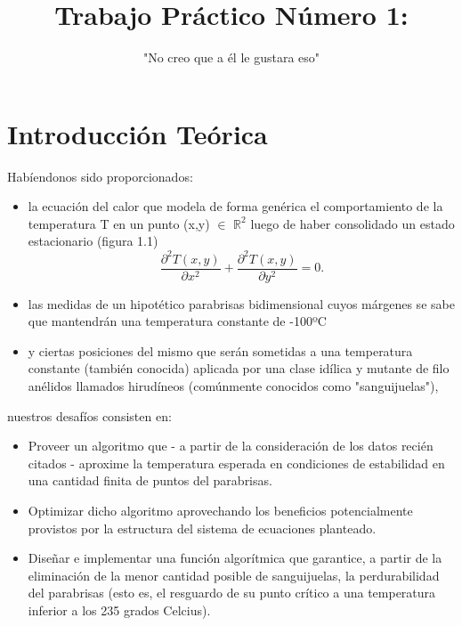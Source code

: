 \documentclass[double, 1.5in, 12pt]{beavtex}
\title{Trabajo Pr\'actico N\'umero 1:}
\subtitle{"No creo que a \'el le gustara eso"}
\begin{document}
\maketitle
\mainmatter


\chapter{Introducci\'on Te\'orica}

Hab\'iendonos sido proporcionados:

\begin{itemize}
\item la ecuaci\'on del calor que modela de forma gen\'erica el comportamiento de la temperatura T en un punto (x,y) $\in$ $\mathbb{R}^2$ luego de haber consolidado un estado estacionario (figura 1.1) \\

\begin{equation}
\frac{\partial^2T(x,y)}{\partial x^{2}}+\frac{\partial^2 T(x,y)}{\partial y^{2}} = 0.
\end{equation}

\item las medidas de un hipot\'etico parabrisas bidimensional cuyos m\'argenes se sabe que mantendr\'an una temperatura constante de -100ºC 

\item y ciertas posiciones del mismo que ser\'an sometidas a una temperatura constante (tambi\'en conocida) aplicada por  una clase id\'ilica y mutante de filo an\'elidos llamados hirud\'ineos (com\'unmente conocidos como "sanguijuelas"),

\end{itemize}

nuestros desaf\'ios consisten en:

\begin{itemize}

\item Proveer un algoritmo que - a partir de la consideraci\'on de los datos reci\'en citados - aproxime la temperatura esperada en condiciones de estabilidad en una cantidad finita de puntos del parabrisas. 

\item Optimizar dicho algoritmo aprovechando los beneficios potencialmente provistos por la estructura del sistema de ecuaciones planteado.

\item Dise\~nar e implementar una funci\'on algor\'itmica que garantice, a partir de la eliminaci\'on de la menor cantidad posible de sanguijuelas, la perdurabilidad del parabrisas (esto es, el resguardo de su punto cr\'itico a una temperatura inferior a los 235 grados Celcius).

\end{itemize}
\end{document}
